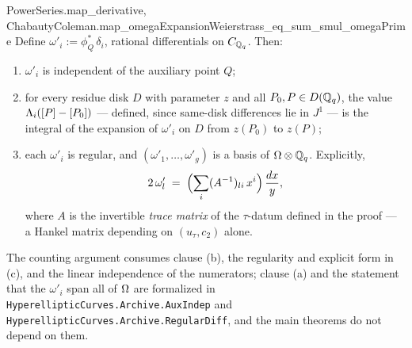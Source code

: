 \begin{theorem}
{  PowerSeries.map_derivative,
  ChabautyColeman.map_omegaExpansionWeierstrass_eq_sum_smul_omegaPrime}
\leanok
Define $\omega'_i := \phi_Q^*\,\delta_i$, rational differentials on $C_{\mathbb{Q}_q}$. Then:
\begin{enumerate}
\item[(a)] $\omega'_i$ is independent of the auxiliary point $Q$;
\item[(b)] for every residue disk $D$ with parameter $z$ and all $P_0, P \in D(\mathbb{Q}_q)$,
the value $\Lambda_i([P]-[P_0])$ --- defined, since same-disk differences lie in $J^1$ ---
is the integral of the expansion of $\omega'_i$ on $D$ from $z(P_0)$ to $z(P)$;
\item[(c)] each $\omega'_i$ is regular, and $(\omega'_1,\dots,\omega'_g)$ is a basis of
$\Omega \otimes \mathbb{Q}_q$. Explicitly,
\[
  2\,\omega'_l \;=\; \Bigl(\sum_i (A^{-1})_{li}\,x^i\Bigr)\,\frac{dx}{y},
\]
where $A$ is the invertible \emph{trace matrix} of the $\tau$-datum defined in the
proof --- a Hankel matrix depending on $(u_\tau, c_2)$ alone.
\end{enumerate}
The counting argument consumes clause (b), the regularity and explicit form in (c), and
the linear independence of the numerators; clause (a) and the statement that the
$\omega'_i$ span all of $\Omega$ are formalized in
\texttt{HyperellipticCurves.Archive.AuxIndep} and
\texttt{HyperellipticCurves.Archive.RegularDiff}, and the main theorems do not depend on them.
\end{theorem}
